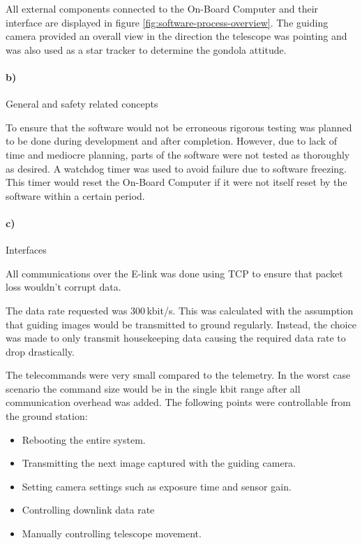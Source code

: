 All external components connected to the On-Board Computer and their interface are displayed in figure \ref{fig:software-process-overview}. The guiding camera provided an overall view in the direction the telescope was pointing and was also used as a star tracker to determine the gondola attitude.

\paragraph{b)} General and safety related concepts

To ensure that the software would not be erroneous rigorous testing was planned to be done during development and after completion. However, due to lack of time and mediocre planning, parts of the software were not tested as thoroughly as desired. A watchdog timer was used to avoid failure due to software freezing. This timer would reset the On-Board Computer if it were not itself reset by the software within a certain period.

\paragraph{c)} Interfaces

All communications over the E-link was done using TCP to ensure that packet loss wouldn't corrupt data.



The data rate requested was 300\,kbit/s. This was calculated with the assumption that guiding images would be transmitted to ground regularly. Instead, the choice was made to only transmit housekeeping data causing the required data rate to drop drastically.

The telecommands were very small compared to the telemetry. In the worst case scenario the command size would be in the single kbit range after all communication overhead was added. The following points were controllable from the ground station:

\begin{itemize}
    \item Rebooting the entire system.
    \item Transmitting the next image captured with the guiding camera.
    \item Setting camera settings such as exposure time and sensor gain.
    \item Controlling downlink data rate
    \item Manually controlling telescope movement.
\end{itemize}

